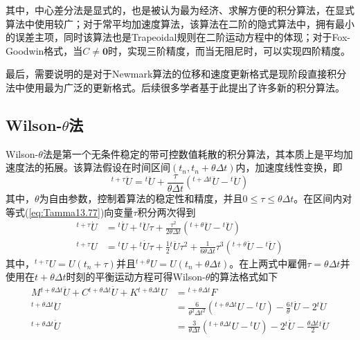 其中，中心差分法是显式的，也是被认为最为经济、求解方便的积分算法，在显式算法中使用较广；对于常平均加速度算法，该算法在二阶的隐式算法中，拥有最小的误差主项\cite{Dahlquist1963}，同时该算法也是Trapeoidal规则在二阶运动方程中的体现；对于Fox-Goodwin格式，当$C\neq\mathbf{0}$时，实现三阶精度，而当无阻尼时，可以实现四阶精度。

最后，需要说明的是对于Newmark算法的位移和速度更新格式是现阶段直接积分法中使用最为广泛的更新格式。后续很多学者基于此提出了许多新的积分算法\cite{Hilber1978,Hilber1977,Wood1980a,KaiPing2008}。
 
\subsection{Wilson-$\theta$法}

Wilson-$\theta$法\cite{Wilson1968}是第一个无条件稳定的带可控数值耗散的积分算法，其本质上是平均加速度法的拓展。该算法假设在时间区间$(t_n,t_{n}+\theta\Delta t)$内，加速度线性变换，即
\begin{equation}
{^{t+\tau}\!\ddot{U}}={^t\!\ddot{U}}+\frac{\tau}{\theta\Delta t}({^{t+\Delta t}\!\ddot{U}}-{^t\!\ddot{U}})\label{eq:Tamma13.77}
\end{equation}
其中，$\theta$为自由参数，控制着算法的稳定性和精度，并且$0\le\tau\le\theta\Delta t$。在区间内对等式(\ref{eq:Tamma13.77})向变量$\tau$积分两次得到
\begin{subequations}
\begin{align}
{^{t+\tau}\!\dot{U}}&={^t\!\dot{U}}+{^t\!\ddot{U}}\tau+\frac{\tau^2}{2\theta\Delta t}({^{t+\theta}\!\ddot{U}}-{^t\!\ddot{U}})\\
{^{t+\tau}\!U}&={^t\!U}+{^t\!\dot{U}}\tau+\frac{1}{2}{^t\!\ddot{U}}\tau^2+\frac{1}{6\theta\Delta t}\tau^3({^{t+\theta}\!\ddot{U}}-{^t\!\ddot{U}})
\end{align}\label{eq:Tamma13.79}
\end{subequations}
其中，${^{t+\tau}\!U}=U(t_n+\tau)$并且${^{t+\theta}\!U}=U(t_n+\theta\Delta t)$。在上两式中雇佣$\tau=\theta\Delta t$并使用在$t+\theta\Delta t$时刻的平衡运动方程可得Wilson-$\theta$的算法格式如下
\begin{subequations}
\begin{align}
M{^{t+\theta\Delta t}\!\ddot{U}}+C{^{t+\theta\Delta t}\!\dot{U}}+K{^{t+\theta\Delta t}\!U}&={^{t+\theta\Delta t}\!F}\\
{^{t+\theta\Delta t}\!\ddot{U}}&=\frac{6}{\theta^2\Delta t^2}({^{t+\theta\Delta t}\!U}-{^t\!U})-\frac{6}{\theta}{^t\!\dot{U}}-2{^t\!\ddot{U}}\\
{^{t+\theta\Delta t}\!\dot{U}}&=\frac{3}{\theta\Delta t}({^{t+\theta\Delta t}\!U}-{^t\!U})-2{^t\!\dot{U}}-\frac{\theta\Delta t}{2}{^t\!\ddot{U}}
\end{align}\label{ee:Tammma13.80}
\end{subequations}
